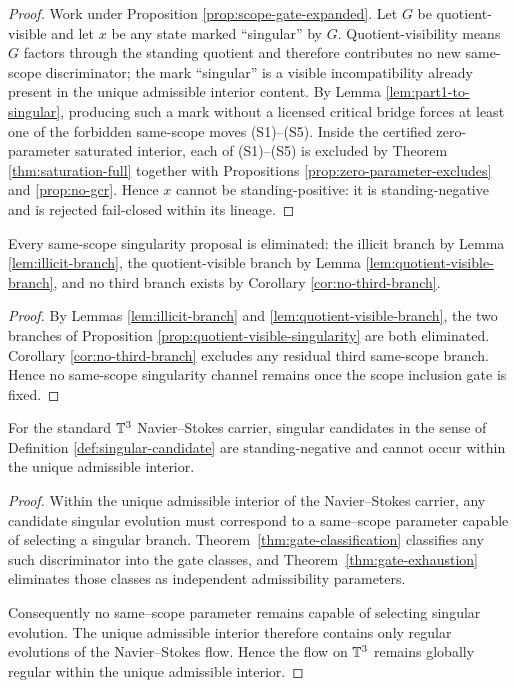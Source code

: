 \begin{proof}
Work under Proposition \ref{prop:scope-gate-expanded}. Let $G$ be quotient-visible and let $x$ be any
state marked ``singular'' by $G$. Quotient-visibility means $G$ factors through the standing
quotient and therefore contributes no new same-scope discriminator; the mark ``singular'' is a
visible incompatibility already present in the unique admissible interior content. By Lemma
\ref{lem:part1-to-singular}, producing such a mark without a licensed critical bridge forces at least
one of the forbidden same-scope moves (S1)--(S5). Inside the certified zero-parameter saturated
interior, each of (S1)--(S5) is excluded by Theorem \ref{thm:saturation-full} together with
Propositions \ref{prop:zero-parameter-excludes} and \ref{prop:no-gcr}. Hence $x$ cannot be
standing-positive: it is standing-negative and is rejected fail-closed within its lineage.

\end{proof}

\begin{proposition}\label{prop:exhaustive-branch-elimination}
Every same-scope singularity proposal is
eliminated: the illicit branch by Lemma \ref{lem:illicit-branch}, the quotient-visible branch by Lemma
\ref{lem:quotient-visible-branch}, and no third branch exists by Corollary \ref{cor:no-third-branch}.
\end{proposition}

\begin{proof}
By Lemmas \ref{lem:illicit-branch} and \ref{lem:quotient-visible-branch}, the two branches of
Proposition \ref{prop:quotient-visible-singularity} are both eliminated. Corollary
\ref{cor:no-third-branch} excludes any residual third same-scope branch. Hence no same-scope
singularity channel remains once the scope inclusion gate is fixed.
\end{proof}


\begin{theorem}\label{thm:structural-closure}
For the standard $\mathbb{T}^3$ Navier--Stokes carrier, singular candidates in the sense of Definition \ref{def:singular-candidate} are standing-negative
and cannot occur within the unique admissible interior.
\end{theorem}

\begin{proof}
Within the unique admissible interior of the Navier--Stokes carrier, any candidate singular evolution must correspond
to a same--scope parameter capable of selecting a singular branch. Theorem~\ref{thm:gate-classification} classifies any such discriminator into the gate classes, and Theorem~\ref{thm:gate-exhaustion} eliminates those classes as independent admissibility parameters.

Consequently no same--scope parameter remains capable of selecting singular evolution. The unique admissible interior
therefore contains only regular evolutions of the Navier--Stokes flow. Hence the flow on $\mathbb{T}^3$ remains globally
regular within the unique admissible interior.
\end{proof}




